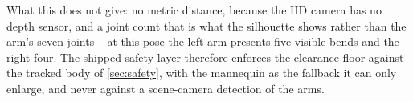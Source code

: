 What this does not give: no metric distance, because the HD camera has no
depth sensor, and a joint count that is what the silhouette shows rather
than the arm's seven joints -- at this pose the left arm presents five
visible bends and the right four. The shipped safety layer therefore
enforces the clearance floor against the tracked body of
\cref{sec:safety}, with the mannequin as the fallback it can only enlarge,
and never against a scene-camera detection of the arms.
